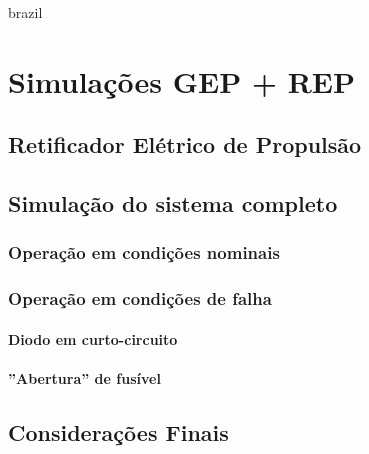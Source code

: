 
\begin{otherlanguage*}{brazil}


\chapter[Simulações GEP + REP]{Simulações GEP + REP}

\section{Retificador Elétrico de Propulsão}

\section{Simulação do sistema completo}

\subsection{Operação em condições nominais}

\subsection{Operação em condições de falha}

\subsubsection{Diodo em curto-circuito}

\subsubsection{''Abertura'' de fusível}

\section{Considerações Finais}


\end{otherlanguage*}


